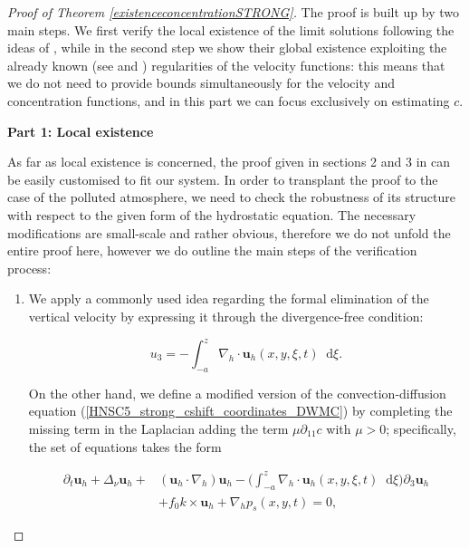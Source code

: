 \documentclass[12pt]{report}
\numberwithin{theorem}{chapter}
\numberwithin{corollary}{chapter}
\numberwithin{lemma}{chapter}
\numberwithin{remark}{chapter}
\numberwithin{definition}{chapter}
\numberwithin{prop}{chapter}
\newcommand*\diff{\mathop{}\!\mathrm{d}}
\begin{document}
\begin{proof}[Proof of Theorem \ref{existenceconcentrationSTRONG}]

The proof is built up by two main steps. We first verify the local existence of the limit solutions following the ideas of \cite{cao2014local}, while in the second step we show their global existence exploiting the already known (see \cite{li2019primitive} and \cite{petcu2005sobolev}) regularities of the velocity functions: this means that we do not need to provide bounds simultaneously for the velocity and concentration functions, and in this part we can focus exclusively on estimating $c.$

\bigskip

\textbf{Part 1: Local existence}

As far as local existence is concerned, the proof given in sections 2 and 3 in \cite{cao2014local} can be easily customised to fit our system. In order to transplant the proof to the case of the polluted atmosphere, we need to check the robustness of its structure with respect to the given form of the hydrostatic equation. The necessary modifications are small-scale and rather obvious, therefore we do not unfold the entire proof here, however we do outline the main steps of the verification process:

\begin{enumerate}
  
  \item We apply a commonly used idea regarding the formal elimination of the vertical velocity by expressing it through the divergence-free condition:
  
  \begin{equation} \label{u_3_expressed_div_free}
  u_3 = - \int_{-a}^z \nabla_h \cdot \mathbf{u}_h (x, y, \xi, t) \diff \xi.
  \end{equation}
  
  On the other hand, we define a modified version of the convection-diffusion equation (\ref{HNSC5_strong_cshift_coordinates_DWMC}) by completing the missing term in the Laplacian adding the term $\mu \partial_{11} c$ with $\mu > 0$; specifically, the set of  equations takes the form
  
  \begin{equation} \label{existenceeqs1}
    \begin{split}
    \partial_t \mathbf{u}_h + \Delta_\nu \mathbf{u}_h + & (\mathbf{u}_h \cdot \nabla_h) \mathbf{u}_h - \bigg ( \int_{-a}^z \nabla_h \cdot \mathbf{u}_h (x, y, \xi, t) \diff \xi \bigg ) \partial_3 \mathbf{u}_h \\
    & + f_0 k \times \mathbf{u}_h + \nabla_h p_s (x,y,t) = 0,
    \end{split}
  \end{equation}
  

\end{enumerate}
\end{proof}
\end{document}
